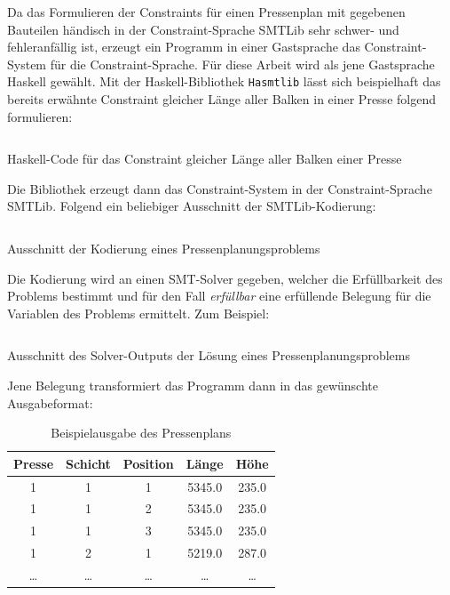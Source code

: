 Da das Formulieren der Constraints für einen Pressenplan mit gegebenen Bauteilen händisch in der Constraint-Sprache SMTLib sehr schwer- und fehleranfällig ist,
erzeugt ein Programm in einer Gastsprache das Constraint-System für die Constraint-Sprache.
Für diese Arbeit wird als jene Gastsprache Haskell \cite{haskellhistory} gewählt.
Mit der Haskell-Bibliothek \texttt{Hasmtlib} \cite{hasmtlib} lässt sich beispielhaft das bereits erwähnte Constraint gleicher Länge aller Balken in einer Presse folgend formulieren:

\begin{listing}[H]
    \inputminted{haskell}{Code/Einleitung/PressenlängeConstraintHaskell.hs}
    \caption{Haskell-Code für das Constraint gleicher Länge aller Balken einer Presse}
    \label{listing:barLengthCode}
\end{listing}

Die Bibliothek erzeugt dann das Constraint-System in der Constraint-Sprache SMTLib.
Folgend ein beliebiger Ausschnitt der SMTLib-Kodierung:

\begin{listing}[H]
    \inputminted{bash}{Code/Einleitung/PressenlängeConstraintSMTLib.smt2}
    \caption{Ausschnitt der Kodierung eines Pressenplanungsproblems}
    \label{listing:barLengthSMTlib}
\end{listing}

Die Kodierung wird an einen SMT-Solver gegeben, welcher die Erfüllbarkeit des Problems bestimmt und für den Fall \textit{erfüllbar} eine erfüllende Belegung für die Variablen des Problems ermittelt.
Zum Beispiel:

\begin{listing}[H]
    \inputminted{bash}{Code/Einleitung/PressenlängeConstraintSolverOutput.smt2}
    \caption{Ausschnitt des Solver-Outputs der Lösung eines Pressenplanungsproblems}
    \label{listing:barLengthSolverOutput}
\end{listing}

Jene Belegung transformiert das Programm dann in das gewünschte Ausgabeformat:

\begin{table}[H]
    \centering
    \begin{tabular}{|c|c|c|c|c|}
        \hline
        \textbf{Presse} & \textbf{Schicht} & \textbf{Position} & \textbf{Länge} & \textbf{Höhe} \\
        \hline
        1 & 1 & 1 & 5345.0 & 235.0 \\
        1 & 1 & 2 & 5345.0 & 235.0 \\
        1 & 1 & 3 & 5345.0 & 235.0 \\
        1 & 2 & 1 & 5219.0 & 287.0 \\
        \ldots & \ldots & \ldots & \ldots & \ldots \\
        \hline
    \end{tabular}
    \caption{Beispielausgabe des Pressenplans}
    \label{table:pressenplan}
\end{table}

